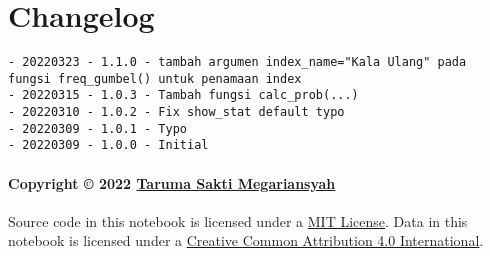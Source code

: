 \documentclass[11pt]{article}
\begin{document}
    \hypertarget{changelog}{%
\section{Changelog}\label{changelog}}

\begin{verbatim}
- 20220323 - 1.1.0 - tambah argumen index_name="Kala Ulang" pada fungsi freq_gumbel() untuk penamaan index
- 20220315 - 1.0.3 - Tambah fungsi calc_prob(...)
- 20220310 - 1.0.2 - Fix show_stat default typo
- 20220309 - 1.0.1 - Typo
- 20220309 - 1.0.0 - Initial
\end{verbatim}

\hypertarget{copyright-2022-taruma-sakti-megariansyah}{%
\paragraph{\texorpdfstring{Copyright © 2022
\href{https://taruma.github.io}{Taruma Sakti
Megariansyah}}{Copyright © 2022 Taruma Sakti Megariansyah}}\label{copyright-2022-taruma-sakti-megariansyah}}

Source code in this notebook is licensed under a
\href{https://choosealicense.com/licenses/mit/}{MIT License}. Data in
this notebook is licensed under a
\href{https://creativecommons.org/licenses/by/4.0/}{Creative Common
Attribution 4.0 International}.


    
    
    
\end{document}
